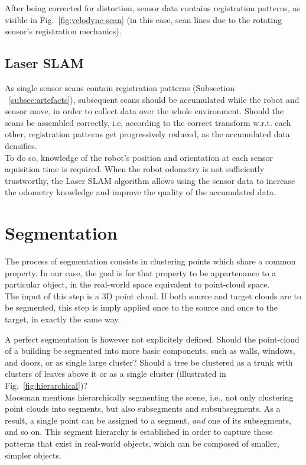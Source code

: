 After being corrected for distortion, sensor data contains registration patterns, as visible in Fig.~\ref{fig:velodyne-scan} (in this case, scan lines due to the rotating sensor's registration mechanics).

\subsection{Laser SLAM}
\label{subsec:SLAM}

As single sensor scans contain registration patterns (Subsection ~\ref{subsec:artefacts}), subsequent scans should be accumulated while the robot and sensor move, in order to collect data over the whole environment. Should the scans be assembled correctly, i.e, according to the correct transform w.r.t. each other, registration patterns get progressively reduced, as the accumulated data densifies.\\

To do so, knowledge of the robot's position and orientation at each sensor aquisition time is required. When the robot odometry is not sufficiently trustworthy, the Laser SLAM algorithm allows using the sensor data to increase the odometry knowledge and improve the quality of the accumulated data.\\

\section{Segmentation}
\label{sec:segmentation}

The process of segmentation consists in clustering points which share a common property. In our case, the goal is for that property to be appartenance to a particular object, in the real-world space equivalent to point-cloud space.\\

The input of this step is a 3D point cloud. If both source and target clouds are to be segmented, this step is imply applied once to the source and once to the target, in exactly the same way.

A perfect segmentation is however not explicitely defined. Should the point-cloud of a building be segmented into more basic components, such as walls, windows, and doors, or as single large cluster? Should a tree be clustered as a trunk with clusters of leaves above it or as a single cluster (illustrated in Fig.~\ref{fig:hierarchical})?\\

Moosman \cite{moosmann2011unsupervised} mentions hierarchically segmenting the scene, i.e., not only clustering point clouds into segments, but also subsegments and subsubsegments. As a result, a single point can be assigned to a segment, \textit{and} one of its subsegments, and so on. This segment hierarchy is established in order to capture those patterns that exist in real-world objects, which can be composed of smaller, simpler objects.\\

